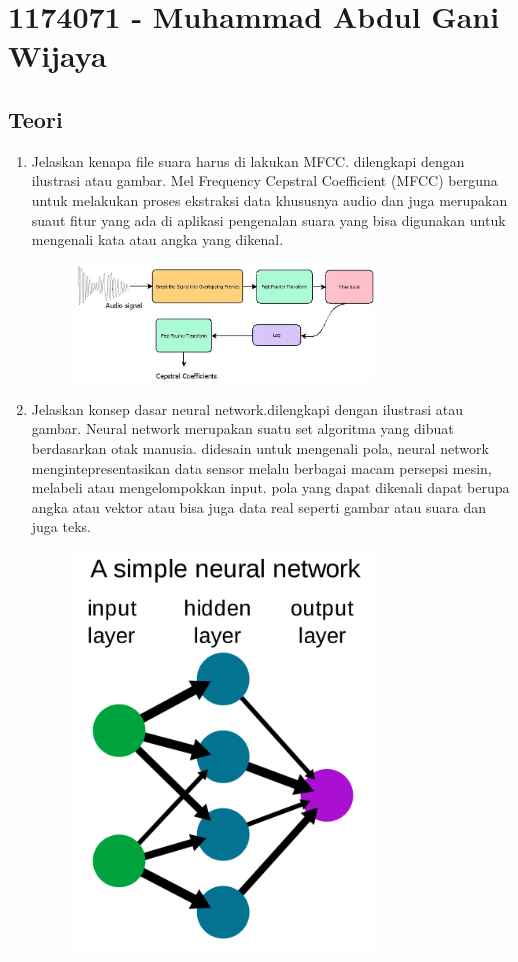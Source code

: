 \section{1174071 - Muhammad Abdul Gani Wijaya}

\subsection{Teori}
\begin{enumerate}
	\item Jelaskan kenapa file suara harus di lakukan MFCC. dilengkapi dengan ilustrasi atau gambar.
	\hfill\break
	Mel Frequency Cepstral Coefficient (MFCC) berguna untuk melakukan proses ekstraksi data khususnya audio dan juga merupakan suaut fitur yang ada di aplikasi pengenalan suara yang bisa digunakan untuk mengenali kata atau angka yang dikenal.
	\hfill\break
	\begin{figure}[H]
		\includegraphics[width=8cm]{figures/1174071/6/mfcc.jpeg}
		\centering
	\end{figure}
	\item Jelaskan konsep dasar neural network.dilengkapi dengan ilustrasi atau gambar.
	\hfill\break
	Neural network merupakan suatu set algoritma yang dibuat berdasarkan otak manusia. didesain untuk mengenali pola, neural network mengintepresentasikan data sensor melalu berbagai macam persepsi mesin, melabeli atau mengelompokkan input. pola yang dapat dikenali dapat berupa angka atau vektor atau bisa juga data real seperti gambar atau suara dan juga teks.
	\hfill\break
	\begin{figure}[H]
		\includegraphics[width=8cm]{figures/1174071/6/neural.png}

\end{figure}
\end{enumerate}
